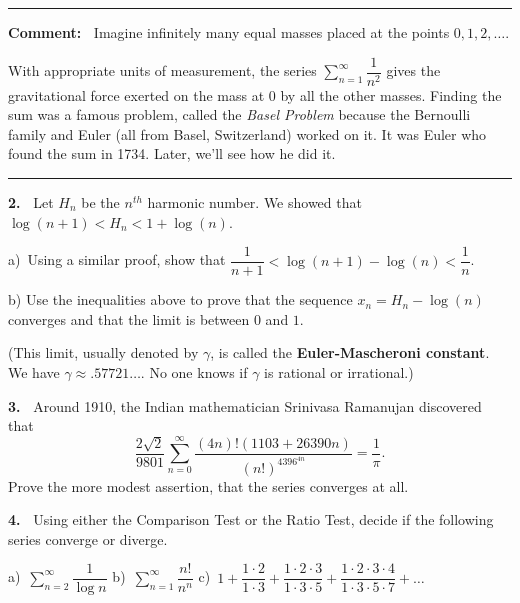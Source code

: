 \documentclass[12pt]{article}
\theoremstyle{definition}
\theoremstyle{remark}
\theoremstyle{definition}
\begin{document}
\rule{\textwidth}{1pt}\newline
{\bf Comment:\ } Imagine infinitely many equal masses placed at the points $0,1,2,\dots$. 
\begin{center}
 \end{center}
With appropriate units of measurement, the series $\sum\limits_{n=1}^\infty\dfrac{1}{n^2}$  gives the gravitational force exerted on the mass at $0$ by all the other masses. Finding the sum was a famous problem, called the {\it Basel Problem} because  the Bernoulli family and Euler (all from Basel, Switzerland) worked on it. It was Euler who found the sum in 1734. Later, we'll see how he did it. 
\newline
\rule{\textwidth}{1pt}

{\bf 2.\ } Let $H_n$ be the $n^{th}$ harmonic number. We showed that 
$\log(n+1)<H_n<1+\log(n)$. 

a)\ Using a similar proof, show that 
$\dfrac{1}{n+1}<\log(n+1)-\log (n)<\dfrac{1}{n}$. 

b) Use the inequalities above to prove that the sequence $x_n=H_n-\log(n)$ converges and that the limit is between $0$ and $1$. 

(This limit, usually denoted by $\gamma$,  is called the {\bf Euler-Mascheroni constant}. We have $\gamma\approx .57721\dots$. No one knows if $\gamma$ is rational or irrational.) 


{\bf 3.\ } 
Around 1910, the Indian mathematician Srinivasa Ramanujan discovered that
\[
\frac{2\sqrt{2}}{9801}\sum_{n=0}^\infty\frac{(4n)!(1103+26390n)}{(n!)^4396^{4n}}=\frac{1}{\pi}.
\]
Prove the more modest assertion, that the series converges at all.

{\bf 4.\ } Using either the Comparison Test or the Ratio Test,  decide if the following series converge or diverge. 

a)\ $\sum\limits_{n=2}^\infty \dfrac{1}{\log n}$\qquad\qquad
b)\ $\sum\limits_{n=1}^\infty \dfrac{n!}{n^n}$\qquad\qquad
c)\ $1+\dfrac{1\cdot 2}{1\cdot 3}+\dfrac{1\cdot 2\cdot 3}{1\cdot 3\cdot 5}+
\dfrac{1\cdot 2\cdot 3\cdot 4}{1\cdot 3\cdot 5\cdot7}+\dots$
\end{document}
